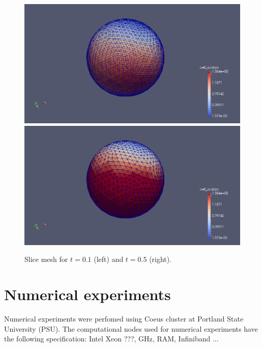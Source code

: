 \documentclass[12pt]{article}
\begin{document}
\begin{figure}[!htb]
%
  \includegraphics[width=\linewidth]{mesh_bothparts.png}
\endminipage\hfill
{}%
  \includegraphics[width=\linewidth]{mesh_bothparts_moment2.png}
\endminipage
\caption{Slice mesh for $t=0.1$ (left) and $t = 0.5$ (right).}
\end{figure}


\section{Numerical experiments}

Numerical experiments were perfomed using Coeus cluster \cite{coeus} at Portland State University (PSU). The computational nodes used for numerical experiments have the following specification: Intel Xeon ???, GHz, RAM, Infiniband ...
\end{document}
